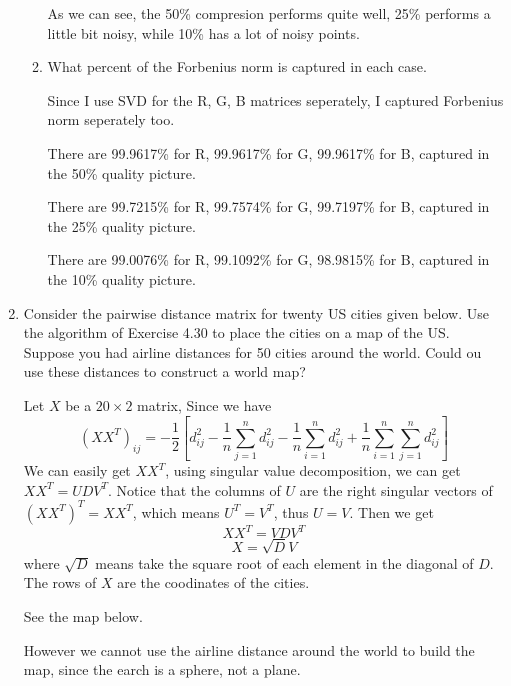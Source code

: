 \documentclass[a4paper, 12pt]{mcshw}
\begin{document}
\begin{enumerate}
\begin{enumerate}
                As we can see, the 50\% compresion performs quite well, 25\% performs a little bit noisy, while 10\% has a lot of noisy points.
                \vspace{4mm}
            \item What percent of the Forbenius norm is captured in each case.

                \vspace{2mm}
                Since I use SVD for the R, G, B matrices seperately, I captured Forbenius norm seperately too. 
                
                There are 99.9617\% for R, 99.9617\% for G, 99.9617\% for B, captured in the 50\% quality picture. 
                
                There are 99.7215\% for R, 99.7574\% for G, 99.7197\% for B, captured in the 25\% quality picture.
                
                There are 99.0076\% for R, 99.1092\% for G, 98.9815\% for B, captured in the 10\% quality picture.
        \end{enumerate}
    \item Consider the pairwise distance matrix for twenty US cities given below. Use the algorithm of Exercise 4.30 to place the cities on a map of the US. Suppose you had airline distances for 50 cities around the world. Could ou use these distances to construct a world map?
        \begin{solution}
            Let $X$ be a $20 \times 2$ matrix, Since we have
            $$(XX^T)_{ij} = -\frac{1}{2}[d_{ij}^2 - \frac{1}{n}\sum_{j = 1}^{n}d_{ij}^2 - \frac{1}{n}\sum_{i = 1}^nd_{ij}^2 + \frac{1}{n}\sum_{i = 1}^n\sum_{j = 1}^nd_{ij}^2]$$
            We can easily get $XX^T$, using singular value decomposition, we can get $XX^T = UDV^T$. Notice that the columns of $U$ are the right singular vectors of $(XX^T)^T = XX^T$, which means $U^T = V^T$, thus $U = V$.  Then we get $$XX^T = VDV^T$$ $$X = \sqrt{D}V$$ where $\sqrt{D}$ means take the square root of each element in the diagonal of $D$. The rows of $X$ are the coodinates of the cities.
            
            See the map below.
            \pagebreak
                \begin{center}
                \end{center}
                However we cannot use the airline distance around the world to build the map, since the earch is a sphere, not a plane.
        \end{solution}
\end{enumerate}
\end{document}
